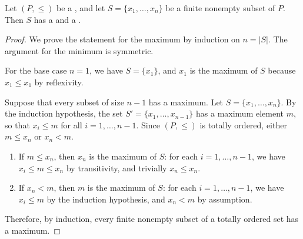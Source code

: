 \begin{lemma} \label{lemma:any_finite_nonempty_subset_of_a_totally_ordered_set_has_a_maximum_and_minimum}
Let $(P, \leq)$ be a , and let $S = \{x_1, \dots, x_n\}$ be a finite nonempty subset of $P$. Then $S$ has a  and a .
\end{lemma}
\begin{proof}
    We prove the statement for the maximum by induction on $n = |S|$. The argument for the minimum is symmetric.

    For the base case $n = 1$, we have $S = \{x_1\}$, and $x_1$ is the maximum of $S$ because $x_1 \leq x_1$ by reflexivity.

    Suppose that every subset of size $n-1$ has a maximum. Let $S = \{x_1, \dots, x_n\}$. By the induction hypothesis, the set $S' = \{x_1, \dots, x_{n-1}\}$ has a maximum element $m$, so that $x_i \leq m$ for all $i = 1, \dots, n-1$. Since $(P, \leq)$ is totally ordered, either $m \leq x_n$ or $x_n < m$.
    \begin{enumerate}
        \item If $m \leq x_n$, then $x_n$ is the maximum of $S$: for each $i = 1, \dots, n-1$, we have $x_i \leq m \leq x_n$ by transitivity, and trivially $x_n \leq x_n$.

        \item If $x_n < m$, then $m$ is the maximum of $S$: for each $i = 1, \dots, n-1$, we have $x_i \leq m$ by the induction hypothesis, and $x_n < m$ by assumption.
    \end{enumerate}

    Therefore, by induction, every finite nonempty subset of a totally ordered set has a maximum.
\end{proof}
